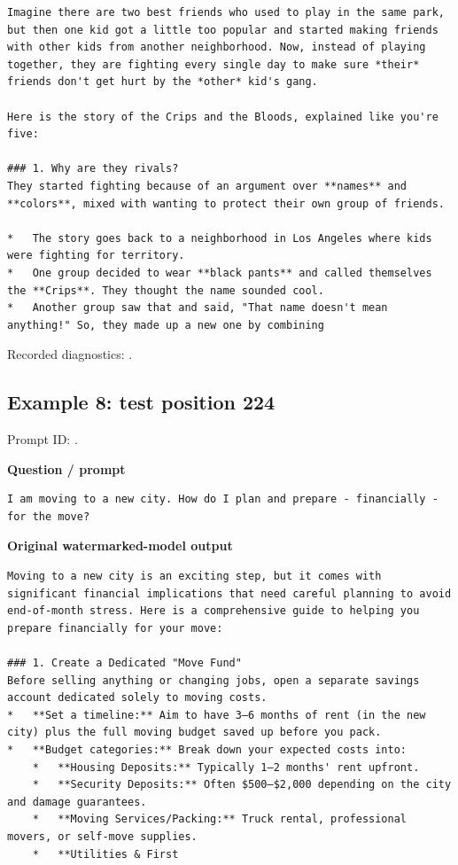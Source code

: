 \begin{Verbatim}
Imagine there are two best friends who used to play in the same park, but then one kid got a little too popular and started making friends with other kids from another neighborhood. Now, instead of playing together, they are fighting every single day to make sure *their* friends don't get hurt by the *other* kid's gang.

Here is the story of the Crips and the Bloods, explained like you're five:

### 1. Why are they rivals?
They started fighting because of an argument over **names** and **colors**, mixed with wanting to protect their own group of friends.

*   The story goes back to a neighborhood in Los Angeles where kids were fighting for territory.
*   One group decided to wear **black pants** and called themselves the **Crips**. They thought the name sounded cool.
*   Another group saw that and said, "That name doesn't mean anything!" So, they made up a new one by combining
\end{Verbatim}

Recorded diagnostics:
\texttt{}.

\subsection{Example 8: test position
224}\label{record-docs-watermarking-qualitative-text-textseal2-direct-topk-md-example-8-test-position-224}

Prompt ID:
\texttt{}.

\textbf{Question / prompt}

\begin{Verbatim}
I am moving to a new city. How do I plan and prepare - financially - for the move?
\end{Verbatim}

\textbf{Original watermarked-model output}

\begin{Verbatim}
Moving to a new city is an exciting step, but it comes with significant financial implications that need careful planning to avoid end-of-month stress. Here is a comprehensive guide to helping you prepare financially for your move:

### 1. Create a Dedicated "Move Fund"
Before selling anything or changing jobs, open a separate savings account dedicated solely to moving costs.
*   **Set a timeline:** Aim to have 3–6 months of rent (in the new city) plus the full moving budget saved up before you pack.
*   **Budget categories:** Break down your expected costs into:
    *   **Housing Deposits:** Typically 1–2 months' rent upfront.
    *   **Security Deposits:** Often $500–$2,000 depending on the city and damage guarantees.
    *   **Moving Services/Packing:** Truck rental, professional movers, or self-move supplies.
    *   **Utilities & First
\end{Verbatim}

